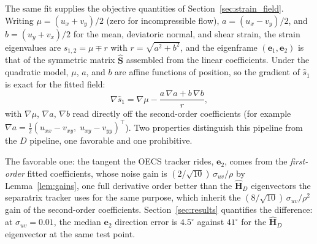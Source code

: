 \documentclass[lettersize,journal]{IEEEtran}
\begin{document}
The same fit supplies the objective quantities of
Section~\ref{sec:strain_field}. Writing $\mu = (u_x + v_y)/2$ (zero for
incompressible flow), $a = (u_x - v_y)/2$, and $b = (u_y + v_x)/2$ for
the mean, deviatoric normal, and shear strain, the strain eigenvalues
are $s_{1,2} = \mu \mp r$ with $r = \sqrt{a^2 + b^2}$, and the
eigenframe $(\mathbf{e}_1, \mathbf{e}_2)$ is that of the symmetric
matrix $\hat{\mathbf{S}}$ assembled from the linear coefficients. Under
the quadratic model, $\mu$, $a$, and $b$ are affine functions of
position, so the gradient of $\hat{s}_1$ is exact for the fitted field:
\begin{equation}
    \nabla \hat{s}_1 = \nabla\mu
    - \frac{a\,\nabla a + b\,\nabla b}{r},
    \label{eq:grad_s1}
\end{equation}
with $\nabla\mu$, $\nabla a$, $\nabla b$ read directly off the
second-order coefficients (for example $\nabla a = \tfrac{1}{2}(u_{xx} -
v_{xy},\; u_{xy} - v_{yy})^\top$). Two properties distinguish this
pipeline from the $D$ pipeline, one favorable and one prohibitive.

The favorable one: the tangent the OECS tracker rides,
$\mathbf{e}_2$, comes from the \emph{first-order} fitted coefficients,
whose noise gain is $(2/\sqrt{10})\,\sigma_{uv}/\rho$ by
Lemma~\ref{lem:gains}, one full derivative order better than the
$\hat{\mathbf{H}}_D$ eigenvectors the separatrix tracker uses for the
same purpose, which inherit the $(8/\sqrt{10})\,\sigma_{uv}/\rho^2$
gain of the second-order coefficients. Section~\ref{sec:results}
quantifies the difference: at $\sigma_{uv} = 0.01$, the median
$\mathbf{e}_2$ direction error is $4.5^\circ$ against $41^\circ$ for
the $\hat{\mathbf{H}}_D$ eigenvector at the same test point.
\end{document}
